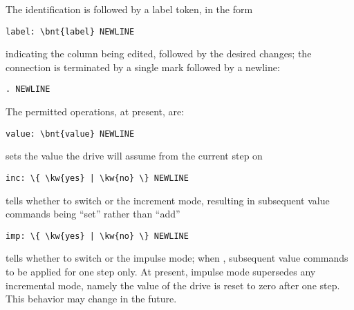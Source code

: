 The identification is followed by a label token, in the form
\begin{Verbatim}[commandchars=\\\{\}]
    label: \bnt{label} NEWLINE
\end{Verbatim}
indicating the column being edited, followed by the desired changes; 
the connection is terminated by a single mark followed by a newline:
\begin{Verbatim}[commandchars=\\\{\}]
    . NEWLINE
\end{Verbatim}
The permitted operations, at present, are:
\begin{Verbatim}[commandchars=\\\{\}]
    value: \bnt{value} NEWLINE
\end{Verbatim}
sets the value the drive will assume from the current step on
\begin{Verbatim}[commandchars=\\\{\}]
    inc: \{ \kw{yes} | \kw{no} \} NEWLINE
\end{Verbatim}
tells whether to switch  or  the increment mode, resulting in
subsequent value commands being ``set'' rather than ``add''
\begin{Verbatim}[commandchars=\\\{\}]
    imp: \{ \kw{yes} | \kw{no} \} NEWLINE
\end{Verbatim}
tells whether to switch  or  the impulse mode;
when , subsequent value commands to be applied for one step only.
At present, impulse mode supersedes any incremental mode, namely
the value of the drive is reset to zero after one step.
This behavior may change in the future.



